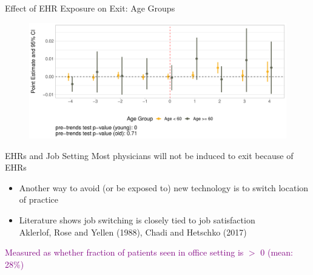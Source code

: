 \documentclass[notes,11pt, aspectratio=169]{beamer}
\begin{document}
\begin{frame}{Effect of EHR Exposure on Exit: Age Groups}
\label{Effect of EHR Exposure on Retirement: Age Groups}
\begin{figure}[ht]
\centering
\includegraphics[scale=.5]{Objects/retire_plot_ages.pdf}
\end{figure}
\end{frame}


\begin{frame}{EHRs and Job Setting}
Most physicians will not be induced to exit because of EHRs
\begin{itemize}
    \item Another way to avoid (or be exposed to) new technology is to switch location of practice
                \vspace{3mm}
    \item Literature shows job switching is closely tied to job satisfaction\\ \scriptsize Aklerlof, Rose and Yellen (1988), Chadi and Hetschko (2017)
                \normalsize
    \end{itemize}

    \vspace{5mm}
    \textcolor{purple}{Measured as whether fraction of patients seen in office setting is $>$ 0 (mean: 28\%)}
\end{frame}
\end{document}
